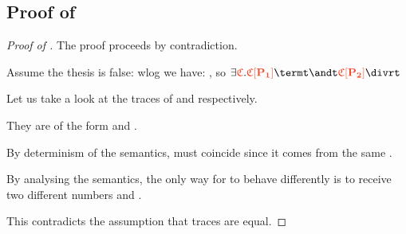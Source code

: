 \documentclass{article}
\theoremstyle{definition}
\begin{document}
\subsection{Proof of }\label{sec:proof-thm:sound-traces}
\begin{proof}[Proof of ]
	The proof proceeds by contradiction.

	Assume the thesis is false: wlog we have: , so $\exists\ctxt.\ctxht{P_1}\termt\andt\ctxht{P_2}\divrt$

	Let us take a look at the traces of  and  respectively.

	They are of the form  and .

	By determinism of the semantics,  must coincide since it comes from the same \ctxt.

	By analysing the semantics, the only way for \ctxt to behave differently is to receive two different numbers  and .

	This contradicts the assumption that traces are equal.
\end{proof}




% 
% 
\end{document}
